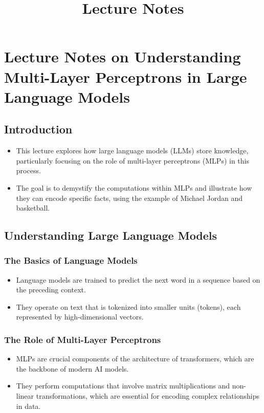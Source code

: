 \documentclass{article}
\title{Lecture Notes}
\author{}
\date{}
\begin{document}
\maketitle
\section*{Lecture Notes on Understanding Multi-Layer Perceptrons in Large Language Models}

\subsection*{Introduction}
\begin{itemize}
\item This lecture explores how large language models (LLMs) store knowledge, particularly focusing on the role of multi-layer perceptrons (MLPs) in this process.
\item The goal is to demystify the computations within MLPs and illustrate how they can encode specific facts, using the example of Michael Jordan and basketball.
\end{itemize}

\subsection*{Understanding Large Language Models}
\subsubsection*{The Basics of Language Models}
\begin{itemize}
\item Language models are trained to predict the next word in a sequence based on the preceding context.
\item They operate on text that is tokenized into smaller units (tokens), each represented by high-dimensional vectors.
\end{itemize}

\subsubsection*{The Role of Multi-Layer Perceptrons}
\begin{itemize}
\item MLPs are crucial components of the architecture of transformers, which are the backbone of modern AI models.
\item They perform computations that involve matrix multiplications and non-linear transformations, which are essential for encoding complex relationships in data.
\end{itemize}
\end{document}
